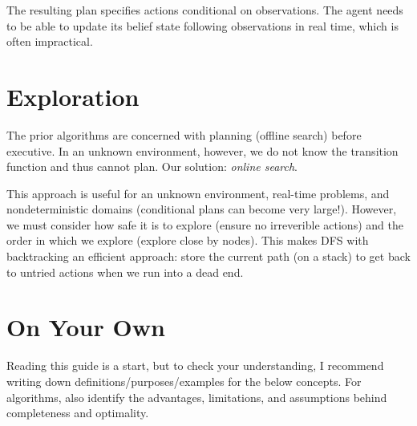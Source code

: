 \documentclass{report}
\begin{document}
The resulting plan specifies actions conditional on observations. The agent needs to be able to update its belief state following observations in real time, which is often impractical.

\section{Exploration}

The prior algorithms are concerned with planning (offline search) before executive. In an unknown environment, however, we do not know the transition function and thus cannot plan. Our solution: \emph{online search}.


This approach is useful for an unknown environment, real-time problems, and nondeterministic domains (conditional plans can become very large!). However, we must consider how safe it is to explore (ensure no irreverible actions) and the order in which we explore (explore close by nodes). This makes DFS with backtracking an efficient approach: store the current path (on a stack) to get back to untried actions when we run into a dead end. 

\clearpage
\section*{On Your Own}

Reading this guide is a start, but to check your understanding, I recommend writing down definitions/purposes/examples for the below concepts. For algorithms, also identify the advantages, limitations, and assumptions behind completeness and optimality.
\end{document}
